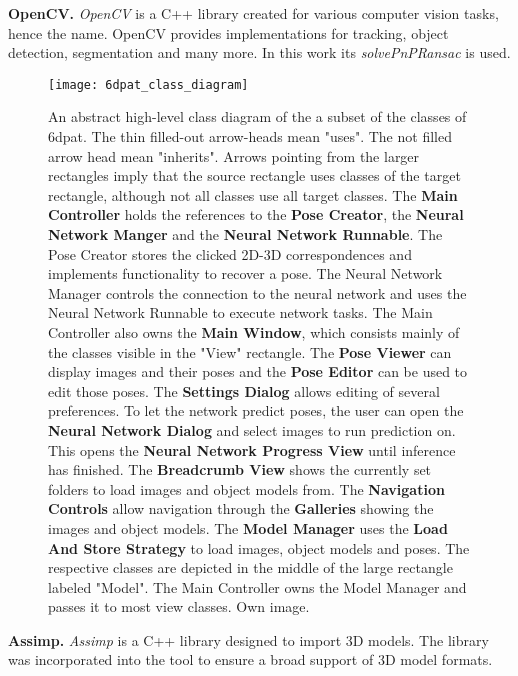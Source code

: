 \noindent\textbf{OpenCV.} \textit{OpenCV} \cite{opencv} is a C++ library created for various computer vision tasks, hence the name. OpenCV provides implementations for tracking, object detection, segmentation and many more. In this work its \textit{solvePnPRansac} is used. \\

\begin{figure}[!tbp]
	\centering
    \texttt{[image: 6dpat\_class\_diagram]}
    \caption{An abstract high-level class diagram of the a subset of the classes of \gls{6dpat}. The thin filled-out arrow-heads mean "uses". The not filled arrow head mean "inherits". Arrows pointing from the larger rectangles imply that the source rectangle uses classes of the target rectangle, although not all classes use all target classes. The \textbf{Main Controller} holds the references to the \textbf{Pose Creator}, the \textbf{Neural Network Manger} and the \textbf{Neural Network Runnable}. The Pose Creator stores the clicked 2D-3D correspondences and implements functionality to recover a pose. The Neural Network Manager controls the connection to the neural network and uses the Neural Network Runnable to execute network tasks. The Main Controller also owns the \textbf{Main Window}, which consists mainly of the classes visible in the "View" rectangle. The \textbf{Pose Viewer} can display images and their poses and the \textbf{Pose Editor} can be used to edit those poses. The \textbf{Settings Dialog} allows editing of several preferences. To let the network predict poses, the user can open the \textbf{Neural Network Dialog} and select images to run prediction on. This opens the \textbf{Neural Network Progress View} until inference has finished. The \textbf{Breadcrumb View} shows the currently set folders to load images and object models from. The \textbf{Navigation Controls} allow navigation through the \textbf{Galleries} showing the images and object models. The \textbf{Model Manager} uses the \textbf{Load And Store Strategy} to load images, object models and poses. The respective classes are depicted in the middle of the large rectangle labeled "Model". The Main Controller owns the Model Manager and passes it to most view classes. Own image.}
    \label{fig:6dpat_class_diagram}
\end{figure} 

\noindent\textbf{Assimp.} \textit{Assimp} \cite{assimp} is a C++ library designed to import 3D models. The library was incorporated into the tool to ensure a broad support of 3D model formats.

